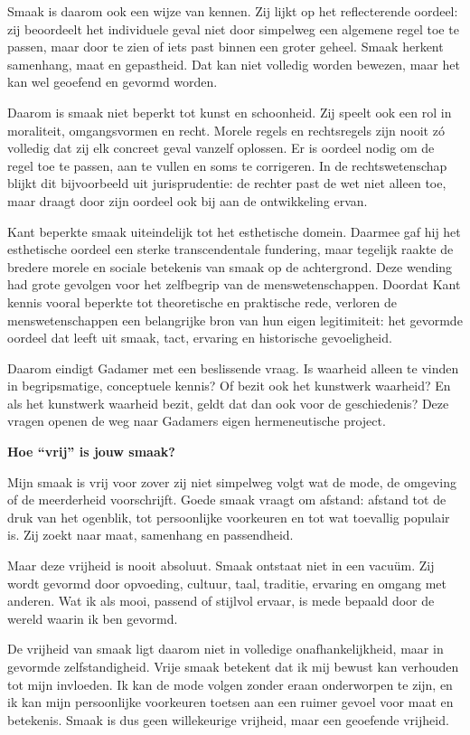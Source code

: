 \documentclass[11pt,twoside,openright]{memoir}
\begin{document}
Smaak is daarom ook een wijze van kennen. Zij lijkt op het reflecterende oordeel: zij beoordeelt het individuele geval niet door simpelweg een algemene regel toe te passen, maar door te zien of iets past binnen een groter geheel. Smaak herkent samenhang, maat en gepastheid. Dat kan niet volledig worden bewezen, maar het kan wel geoefend en gevormd worden.

Daarom is smaak niet beperkt tot kunst en schoonheid. Zij speelt ook een rol in moraliteit, omgangsvormen en recht. Morele regels en rechtsregels zijn nooit zó volledig dat zij elk concreet geval vanzelf oplossen. Er is oordeel nodig om de regel toe te passen, aan te vullen en soms te corrigeren. In de rechtswetenschap blijkt dit bijvoorbeeld uit jurisprudentie: de rechter past de wet niet alleen toe, maar draagt door zijn oordeel ook bij aan de ontwikkeling ervan.

Kant beperkte smaak uiteindelijk tot het esthetische domein. Daarmee gaf hij het esthetische oordeel een sterke transcendentale fundering, maar tegelijk raakte de bredere morele en sociale betekenis van smaak op de achtergrond. Deze wending had grote gevolgen voor het zelfbegrip van de menswetenschappen. Doordat Kant kennis vooral beperkte tot theoretische en praktische rede, verloren de menswetenschappen een belangrijke bron van hun eigen legitimiteit: het gevormde oordeel dat leeft uit smaak, tact, ervaring en historische gevoeligheid.

Daarom eindigt Gadamer met een beslissende vraag. Is waarheid alleen te vinden in begripsmatige, conceptuele kennis? Of bezit ook het kunstwerk waarheid? En als het kunstwerk waarheid bezit, geldt dat dan ook voor de geschiedenis? Deze vragen openen de weg naar Gadamers eigen hermeneutische project.

\bigskip
\noindent
\textbf{Hoe ``vrij'' is jouw smaak?}
\medskip

Mijn smaak is vrij voor zover zij niet simpelweg volgt wat de mode, de omgeving of de meerderheid voorschrijft. Goede smaak vraagt om afstand: afstand tot de druk van het ogenblik, tot persoonlijke voorkeuren en tot wat toevallig populair is. Zij zoekt naar maat, samenhang en passendheid.

Maar deze vrijheid is nooit absoluut. Smaak ontstaat niet in een vacuüm. Zij wordt gevormd door opvoeding, cultuur, taal, traditie, ervaring en omgang met anderen. Wat ik als mooi, passend of stijlvol ervaar, is mede bepaald door de wereld waarin ik ben gevormd.

De vrijheid van smaak ligt daarom niet in volledige onafhankelijkheid, maar in gevormde zelfstandigheid. Vrije smaak betekent dat ik mij bewust kan verhouden tot mijn invloeden. Ik kan de mode volgen zonder eraan onderworpen te zijn, en ik kan mijn persoonlijke voorkeuren toetsen aan een ruimer gevoel voor maat en betekenis. Smaak is dus geen willekeurige vrijheid, maar een geoefende vrijheid.
\end{document}
